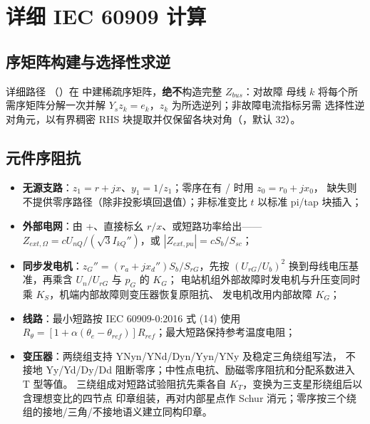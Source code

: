\section{详细 IEC 60909 计算}\label{sec:sc-detailed}

\subsection{序矩阵构建与选择性求逆}
详细路径 （）在
 中建稀疏序矩阵，\textbf{绝不}构造完整 $Z_{bus}$：对故障
母线 $k$ 将每个所需序矩阵分解一次并解 $Y_s z_k=e_k$，$z_k$ 为所选逆列；非故障电流指标另需
选择性逆对角元，以有界稠密 RHS 块提取并仅保留各块对角（，默认 32）。

\subsection{元件序阻抗}
\begin{itemize}
  \item \textbf{无源支路}：$z_1=r+jx$、$y_1=1/z_1$；零序在有 / 时用 $z_0=r_0+jx_0$，
        缺失则不提供零序路径（除非投影填回退值）；非标准变比 $t$ 以标准 pi/tap 块插入；
  \item \textbf{外部电网}：由 +、直接标幺 $r/x$、或短路功率给出——
        $Z_{ext,\Omega}=cU_{nQ}/(\sqrt3 I_{kQ}'')$，或 $|Z_{ext,pu}|=cS_b/S_{sc}$；
  \item \textbf{同步发电机}：$z_G''=(r_a+jx_d'')S_b/S_{rG}$，先按
        $(U_{rG}/U_b)^2$ 换到母线电压基准，再乘含 $U_n/U_{rG}$ 与 $p_G$ 的 $K_G$；
        电站机组外部故障时发电机与升压变同时乘 $K_S$，机端内部故障则变压器恢复原阻抗、
        发电机改用内部故障 $K_G$；
  \item \textbf{线路}：最小短路按 IEC 60909-0:2016 式 (14) 使用
        $R_\theta=[1+\alpha(\theta_e-\theta_{ref})]R_{ref}$；最大短路保持参考温度电阻；
  \item \textbf{变压器}：两绕组支持 YNyn/YNd/Dyn/Yyn/YNy 及稳定三角绕组写法，
        不接地 Yy/Yd/Dy/Dd 阻断零序；中性点电抗、励磁零序阻抗和分配系数进入 T 型等值。
        三绕组成对短路试验阻抗先乘各自 $K_T$，变换为三支星形绕组后以含理想变比的四节点
        印章组装，再对内部星点作 Schur 消元；零序按三个绕组的接地/三角/不接地语义建立同构印章。
\end{itemize}

